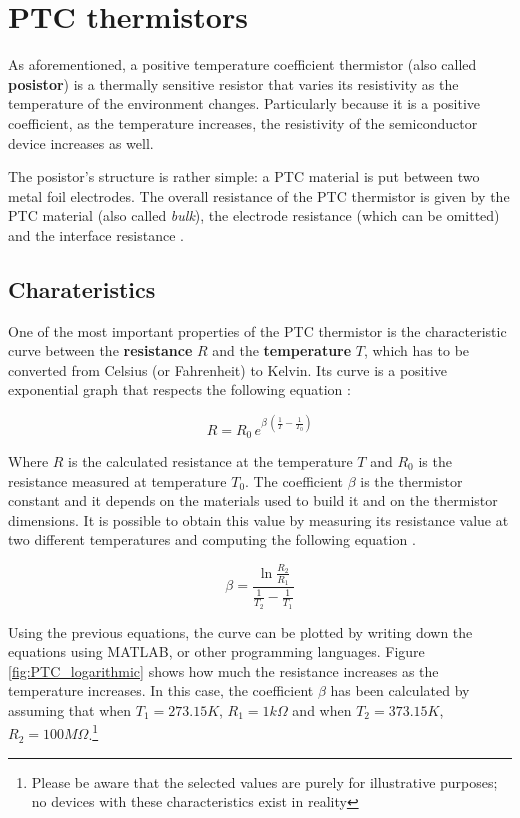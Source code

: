 \vspace{30px}\section{PTC thermistors}
As aforementioned, a positive temperature coefficient thermistor (also called \textbf{posistor}) is a thermally sensitive resistor that varies its resistivity as the temperature of the environment changes. Particularly because it is a positive coefficient, as the temperature increases, the resistivity of the semiconductor device increases as well.

The posistor's structure is rather simple: a PTC material is put between two metal foil electrodes. The overall resistance of the PTC thermistor is given by the PTC material (also called \textsl{bulk}), the electrode resistance (which can be omitted) and the interface resistance \cite{Tang2023}. 

\subsection{Charateristics}
One of the most important properties of the PTC thermistor is the characteristic curve between the \textbf{resistance} $R$ and the \textbf{temperature} $T$, which has to be converted from Celsius (or Fahrenheit) to Kelvin. Its curve is a positive exponential graph that respects the following equation \cite{Saburi196353}\cite{jones2010biomedical}:

\begin{equation*}
    R = R_0\,e^{\beta\,(\frac{1}{T} - \frac{1}{T_0})}
\end{equation*}

\noindent Where $R$ is the calculated resistance at the temperature $T$ and $R_0$ is the resistance measured at temperature $T_0$. The coefficient $\beta$ is the thermistor constant and it depends on the materials used to build it and on the thermistor dimensions. It is possible to obtain this value by measuring its resistance value at two different temperatures and computing the following equation \cite{Saburi196353}.

\begin{equation*}
    \beta = \frac{\ln{\frac{R_2}{R_1}}}{\frac{1}{T_2} - \frac{1}{T_1}}
\end{equation*}

\noindent Using the previous equations, the curve can be plotted by writing down the equations using MATLAB, or other programming languages. Figure \ref{fig:PTC_logarithmic} shows how much the resistance increases as the temperature increases. In this case, the coefficient $\beta$ has been calculated by assuming that when $T_1 = 273.15 K$, $R_1 = 1k\Omega$ and when $T_2 = 373.15 K$, $R_2 = 100M\Omega$.\footnote{Please be aware that the selected values are purely for illustrative purposes; no devices with these characteristics exist in reality}


